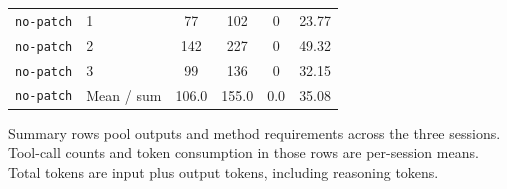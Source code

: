 \begin{table}[H]
\begin{tabular*}{\linewidth}{@{\extracolsep{\fill}}llcccc@{}}
\addlinespace
\texttt{no-patch} & 1 & 77 & 102 & 0 & 23.77 \\
\texttt{no-patch} & 2 & 142 & 227 & 0 & 49.32 \\
\texttt{no-patch} & 3 & 99 & 136 & 0 & 32.15 \\
\texttt{no-patch} & Mean / sum & 106.0 & 155.0 & 0.0 & 35.08 \\
\bottomrule
\end{tabular*}
\par\vspace{0.4em}
{\normalsize Summary rows pool outputs and method requirements across the three
  sessions. Tool-call counts and token consumption in those rows are per-session
  means. Total tokens are input plus output tokens, including reasoning tokens.}
\end{table}
